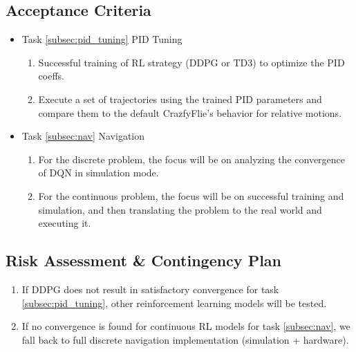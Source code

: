 \documentclass{article}
\begin{document}
 \subsection{Acceptance Criteria}
 
 \begin{itemize}
 	\item Task \ref{subsec:pid_tuning} PID Tuning
 	\begin{enumerate}
 		\item Successful training of RL strategy (DDPG or TD3) to optimize the PID coeffs.
 		\item Execute a set of trajectories using the trained PID parameters and compare them to the default CrazfyFlie's behavior for relative motions.
 	\end{enumerate} 
 \end{itemize}
 
  \begin{itemize}
 	\item Task \ref{subsec:nav} Navigation
 	\begin{enumerate}
 		\item For the discrete problem, the focus will be on analyzing the convergence of DQN in simulation mode.
 		\item For the continuous problem, the focus will be on successful training and simulation, and then translating the problem to the real world and executing it.
 	\end{enumerate} 
 \end{itemize}

\subsection{Risk Assessment \& Contingency Plan}
 
\begin{enumerate}
	\item If DDPG does not result in satisfactory convergence for task \ref{subsec:pid_tuning}, other reinforcement learning models will be tested. 
	\item If no convergence is found for continuous RL models for task \ref{subsec:nav}, we fall back to full discrete navigation implementation (simulation + hardware).
\end{enumerate}
\end{document}
